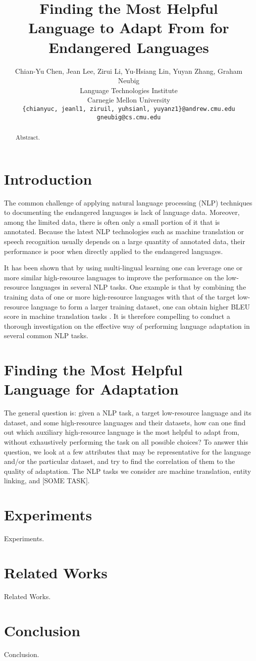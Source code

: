 \documentclass[11pt,a4paper,usenames,dvipsnames]{article}
\title{Finding the Most Helpful Language to Adapt From for Endangered Languages}
\author{Chian-Yu Chen, Jean Lee, Zirui Li, Yu-Hsiang Lin, Yuyan Zhang, Graham Neubig \\
  Language Technologies Institute \\
  Carnegie Mellon University \\
  {\tt \{chianyuc, jeanl1, ziruil, yuhsianl, yuyanz1\}@andrew.cmu.edu} \\
  {\tt gneubig@cs.cmu.edu} \\}
\date{}
\begin{document}
\maketitle
\begin{abstract}
{\color{blue}Abstract.}
\end{abstract}

\section{Introduction}

The common challenge of applying natural language processing (NLP) techniques to documenting the endangered languages is lack of language data. Moreover, among the limited data, there is often only a small portion of it that is annotated. Because the latest NLP technologies such as machine translation or speech recognition usually depends on a large quantity of annotated data, their performance is poor when directly applied to the endangered languages.

It has been shown that by using multi-lingual learning one can leverage one or more similar high-resource languages to improve the performance on the low-resource languages in several NLP tasks. One example is that by combining the training data of one or more high-resource languages with that of the target low-resource language to form a larger training dataset, one can obtain higher BLEU score in machine translation tasks \citep{Neubig2018}. It is therefore compelling to conduct a thorough investigation on the effective way of performing language adaptation in several common NLP tasks.


\section{Finding the Most Helpful Language for Adaptation}

The general question is: given a NLP task, a target low-resource language and its dataset, and some high-resource languages and their datasets, how can one find out which auxiliary high-resource language is the most helpful to adapt from, without exhaustively performing the task on all possible choices? To answer this question, we look at a few attributes that may be representative for the language and/or the particular dataset, and try to find the correlation of them to the quality of adaptation. The NLP tasks we consider are machine translation, entity linking, and {\color{blue}[SOME TASK]}.




\section{Experiments}

{\color{blue}Experiments.}


\section{Related Works}

{\color{blue}Related Works.}


\section{Conclusion}

{\color{blue}Conclusion.}




\end{document}
